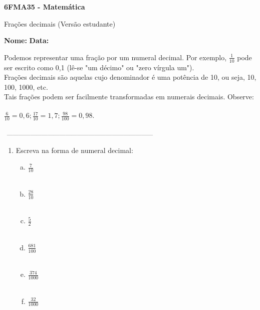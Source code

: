 \documentclass[a4paper,14pt]{article}
\begin{document}
	
	\noindent\textbf{6FMA35 - Matemática} 
	
	\begin{center}Frações decimais (Versão estudante)
	\end{center}
	
	\noindent\textbf{Nome:} \underline{\hspace{10cm}}
	\noindent\textbf{Data:} \underline{\hspace{4cm}}
	
    \begin{multicols}{2}
    	\noindent Podemos representar uma fração por um numeral decimal. Por exemplo, $\frac{1}{10}$ pode ser escrito como 0,1 (lê-se "um décimo" ou "zero vírgula um"). \\
    	Frações decimais são aquelas cujo denominador é uma potência de 10, ou seja, 10, 100, 1000, etc. \\
    	Tais frações podem ser facilmente transformadas em numerais decimais. Observe: \\\\
    	$\frac{6}{10} = 0,6; \frac{17}{10} = 1,7; \frac{98}{100} = 0,98.$ \\\\
    	\noindent\textsubscript{~---------------------------------------------------------------------------}
    	\begin{enumerate}
			\item Escreva na forma de numeral decimal:
			\begin{enumerate}[a)]
				\item $\frac{7}{10}$ \\\\
				\item $\frac{28}{10}$ \\\\
				\item $\frac{5}{2}$ \\\\
				\item $\frac{681}{100}$ \\\\
				\item $\frac{374}{1000}$ \\\\
				\item $\frac{32}{1000}$ \\\\

\end{enumerate}
\end{enumerate}
\end{multicols}
\end{document}
